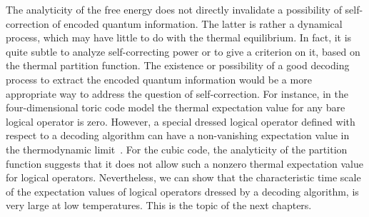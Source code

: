 The analyticity of the free energy does not directly invalidate
a possibility of self-correction of encoded quantum information.
The latter is rather a dynamical process,
which may have little to do with the thermal equilibrium.
In fact, it is quite subtle to analyze self-correcting power
or to give a criterion on it, based on the thermal partition function.
The existence or possibility of a good decoding process
to extract the encoded quantum information
would be a more appropriate way to address the question of self-correction.
For instance, in the four-dimensional toric code model
the thermal expectation value for any bare logical operator is zero.
However, a special dressed logical operator defined with respect to a decoding algorithm
can have a non-vanishing expectation value in the thermodynamic
limit~\cite{ChesiLossBravyiEtAl2010Thermodynamic}.
For the cubic code, the analyticity of the partition function suggests that
it does not allow such a nonzero thermal expectation value for logical operators.
Nevertheless, we can show that the characteristic time scale
of the expectation values of logical operators dressed by a decoding algorithm,
is very large at low temperatures.
This is the topic of the next chapters.